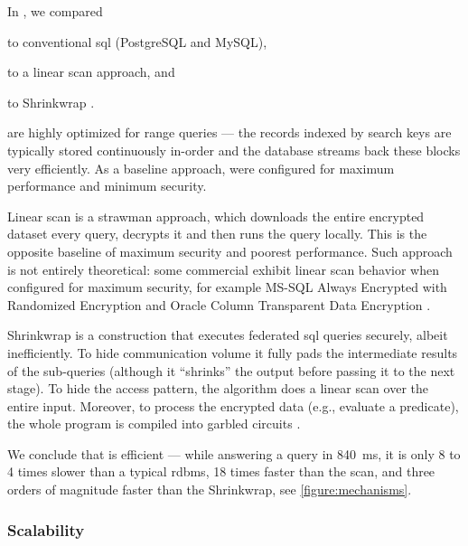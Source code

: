 				In \cite{epsolute}, we compared \epsolute{}
				\begin{enumerate*}[label=(\alph*)] %
					\item to conventional \acrshort{sql}  (PostgreSQL and MySQL),
					\item to a linear scan approach, and
					\item to Shrinkwrap \cite{shrinkwrap}.
				\end{enumerate*}

				 are highly optimized for range queries --- the records indexed by search keys are typically stored continuously in-order and the database streams back these blocks very efficiently.
				As a baseline approach,  were configured for maximum performance and minimum security.

				Linear scan is a strawman approach, which downloads the entire encrypted dataset every query, decrypts it and then runs the query locally.
				This is the opposite baseline of maximum security and poorest performance.
				Such approach is not entirely theoretical: some commercial  exhibit linear scan behavior when configured for maximum security, for example MS-SQL Always Encrypted with Randomized Encryption \cite{mssql-always-enc} and Oracle Column Transparent Data Encryption \cite{oracle-tde}.

				Shrinkwrap \cite{shrinkwrap} is a construction that executes federated \acrshort{sql} queries securely, albeit inefficiently.
				To hide communication volume it fully pads the intermediate results of the sub-queries (although it ``shrinks'' the output before passing it to the next stage).
				To hide the access pattern, the algorithm does a linear scan over the entire input.
				Moreover, to process the encrypted data (e.g., evaluate a predicate), the whole program is compiled into garbled circuits \cite{yao-circuits,emp-toolkit}.

				

				We conclude that \epsolute{} is efficient --- while answering a query in \SI{840}{\milli\second}, it is only 8 to 4 times slower than a typical \acrlong{rdbms}, 18 times faster than the scan, and three orders of magnitude faster than the Shrinkwrap, see \cref{figure:mechanisms}.

			\subsubsection{Scalability}

